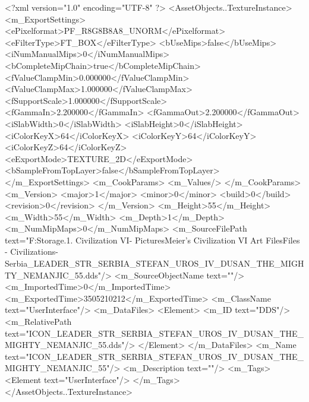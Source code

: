 <?xml version="1.0" encoding="UTF-8" ?>
<AssetObjects..TextureInstance>
	<m_ExportSettings>
		<ePixelformat>PF_R8G8B8A8_UNORM</ePixelformat>
		<eFilterType>FT_BOX</eFilterType>
		<bUseMips>false</bUseMips>
		<iNumManualMips>0</iNumManualMips>
		<bCompleteMipChain>true</bCompleteMipChain>
		<fValueClampMin>0.000000</fValueClampMin>
		<fValueClampMax>1.000000</fValueClampMax>
		<fSupportScale>1.000000</fSupportScale>
		<fGammaIn>2.200000</fGammaIn>
		<fGammaOut>2.200000</fGammaOut>
		<iSlabWidth>0</iSlabWidth>
		<iSlabHeight>0</iSlabHeight>
		<iColorKeyX>64</iColorKeyX>
		<iColorKeyY>64</iColorKeyY>
		<iColorKeyZ>64</iColorKeyZ>
		<eExportMode>TEXTURE_2D</eExportMode>
		<bSampleFromTopLayer>false</bSampleFromTopLayer>
	</m_ExportSettings>
	<m_CookParams>
		<m_Values/>
	</m_CookParams>
	<m_Version>
		<major>1</major>
		<minor>0</minor>
		<build>0</build>
		<revision>0</revision>
	</m_Version>
	<m_Height>55</m_Height>
	<m_Width>55</m_Width>
	<m_Depth>1</m_Depth>
	<m_NumMipMaps>0</m_NumMipMaps>
	<m_SourceFilePath text="F:\Mod Storage\2.1. Civilization VI\Mods\Archive - Pictures\Sid Meier's Civilization VI Art Files\Art Files - Civilizations\Civilization - Serbia\ICON_LEADER_STR_SERBIA_STEFAN_UROS_IV_DUSAN_THE_MIGHTY_NEMANJIC_55.dds"/>
	<m_SourceObjectName text=""/>
	<m_ImportedTime>0</m_ImportedTime>
	<m_ExportedTime>3505210212</m_ExportedTime>
	<m_ClassName text="UserInterface"/>
	<m_DataFiles>
		<Element>
			<m_ID text="DDS"/>
			<m_RelativePath text="ICON_LEADER_STR_SERBIA_STEFAN_UROS_IV_DUSAN_THE_MIGHTY_NEMANJIC_55.dds"/>
		</Element>
	</m_DataFiles>
	<m_Name text="ICON_LEADER_STR_SERBIA_STEFAN_UROS_IV_DUSAN_THE_MIGHTY_NEMANJIC_55"/>
	<m_Description text=""/>
	<m_Tags>
		<Element text="UserInterface"/>
	</m_Tags>
</AssetObjects..TextureInstance>

